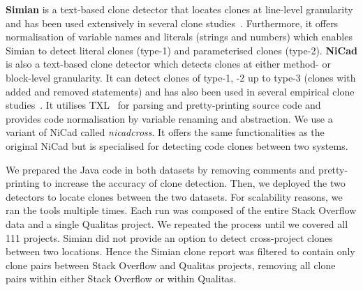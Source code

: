 \documentclass[sigconf,review, anonymous]{acmart}
\begin{document}
\textbf{Simian} is a text-based clone detector that locates clones at
line-level granularity and has been used extensively in several clone
studies~\cite{Ragkhitwetsagul2016, Wang2013, Mondal2011, Cheung2015,
  Krinke2010}.
Furthermore, it offers normalisation of variable names and literals
(strings and numbers) which enables Simian to detect literal clones
(type-1) and parameterised clones (type-2). \textbf{NiCad} is also a
text-based clone detector which detects clones at either method- or
block-level granularity. It can detect clones of type-1, -2 up to
type-3 (clones with added and removed statements) and has
also been used in several empirical clone studies~\cite{Roy2008,
  Ragkhitwetsagul2016, Svajlenko2014, Wang2013, Mondal2011,
  Sajnani2016}. It utilises TXL~\cite{Cordy2006} for parsing and
pretty-printing source code and provides code normalisation by
variable renaming and abstraction. We use a variant of NiCad called
\textit{nicadcross}. It offers the same functionalities as the
original NiCad but is specialised for detecting code clones between
two systems. 

We prepared the Java code in both datasets by removing comments and
pretty-printing to increase the accuracy of clone detection. Then, we
deployed the two detectors to locate clones between the two
datasets. For scalability reasons, we %
ran the tools multiple
times. Each run was composed of the entire Stack Overflow data and a
single Qualitas project. We repeated the process until we covered all
111 projects.  
Simian did not provide an option to detect
cross-project clones between two locations. Hence the Simian clone
report was filtered to contain only clone pairs between Stack Overflow
and Qualitas projects, removing all clone pairs within either Stack
Overflow or within Qualitas. 
\end{document}

